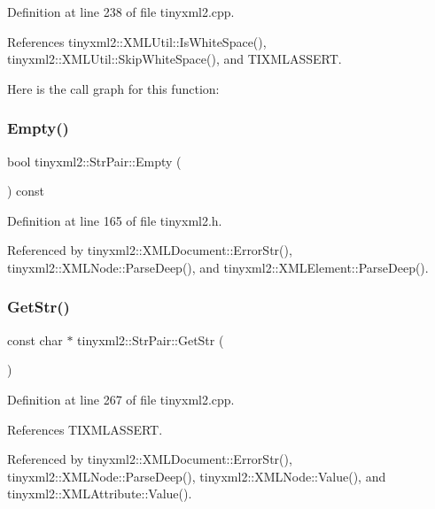 Definition at line 238 of file tinyxml2.\+cpp.



References tinyxml2\+::\+X\+M\+L\+Util\+::\+Is\+White\+Space(), tinyxml2\+::\+X\+M\+L\+Util\+::\+Skip\+White\+Space(), and T\+I\+X\+M\+L\+A\+S\+S\+E\+RT.

Here is the call graph for this function\+:
\mbox{\label{classtinyxml2_1_1_str_pair_aca963a7eaa900bfddbea7312f040b39c}} 
\subsubsection{Empty()}
{\footnotesize\ttfamily bool tinyxml2\+::\+Str\+Pair\+::\+Empty (\begin{DoxyParamCaption}{ }\end{DoxyParamCaption}) const\hspace{0.3cm}{\ttfamily [inline]}}



Definition at line 165 of file tinyxml2.\+h.



Referenced by tinyxml2\+::\+X\+M\+L\+Document\+::\+Error\+Str(), tinyxml2\+::\+X\+M\+L\+Node\+::\+Parse\+Deep(), and tinyxml2\+::\+X\+M\+L\+Element\+::\+Parse\+Deep().

\mbox{\label{classtinyxml2_1_1_str_pair_ad87e3d11330f5e689ba1e7e54c023b57}} 
\subsubsection{Get\+Str()}
{\footnotesize\ttfamily const char $\ast$ tinyxml2\+::\+Str\+Pair\+::\+Get\+Str (\begin{DoxyParamCaption}{ }\end{DoxyParamCaption})}



Definition at line 267 of file tinyxml2.\+cpp.



References T\+I\+X\+M\+L\+A\+S\+S\+E\+RT.



Referenced by tinyxml2\+::\+X\+M\+L\+Document\+::\+Error\+Str(), tinyxml2\+::\+X\+M\+L\+Node\+::\+Parse\+Deep(), tinyxml2\+::\+X\+M\+L\+Node\+::\+Value(), and tinyxml2\+::\+X\+M\+L\+Attribute\+::\+Value().

